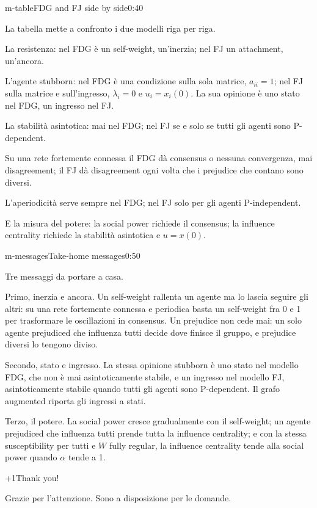 \begin{slide}{m-table}{FDG and FJ side by side}{0:40}
  \begin{discorso}
    \item La tabella mette a confronto i due modelli riga per riga.
    \item La resistenza: nel FDG è un self-weight, un'inerzia; nel FJ un attachment, un'ancora.
    \item L'agente stubborn: nel FDG è una condizione sulla sola matrice, $a_{ii}=1$; nel FJ sulla matrice e sull'ingresso, $\lambda_i=0$ e $u_i=x_i(0)$. La sua opinione è uno stato nel FDG, un ingresso nel FJ.
    \item La stabilità asintotica: mai nel FDG; nel FJ se e solo se tutti gli agenti sono P-dependent.
    \item Su una rete fortemente connessa il FDG dà consensus o nessuna convergenza, mai disagreement; il FJ dà disagreement ogni volta che i prejudice che contano sono diversi.
    \item L'aperiodicità serve sempre nel FDG; nel FJ solo per gli agenti P-independent.
    \item E la misura del potere: la social power richiede il consensus; la influence centrality richiede la stabilità asintotica e $u=x(0)$.
  \end{discorso}
\end{slide}

\begin{slide}{m-messages}{Take-home messages}{0:50}
  \begin{discorso}
    \item Tre messaggi da portare a casa.
    \item Primo, inerzia e ancora. Un self-weight rallenta un agente ma lo lascia seguire gli altri: su una rete fortemente connessa e periodica basta un self-weight fra 0 e 1 per trasformare le oscillazioni in consensus. Un prejudice non cede mai: un solo agente prejudiced che influenza tutti decide dove finisce il gruppo, e prejudice diversi lo tengono diviso.
    \item Secondo, stato e ingresso. La stessa opinione stubborn è uno stato nel modello FDG, che non è mai asintoticamente stabile, e un ingresso nel modello FJ, asintoticamente stabile quando tutti gli agenti sono P-dependent. Il grafo augmented riporta gli ingressi a stati.
    \item Terzo, il potere. La social power cresce gradualmente con il self-weight; un agente prejudiced che influenza tutti prende tutta la influence centrality; e con la stessa susceptibility per tutti e $W$ fully regular, la influence centrality tende alla social power quando $\alpha$ tende a 1.
  \end{discorso}
\end{slide}

\begin{slidepag}{\the\numexpr{}+1\relax}{Thank you!}{}
  \begin{discorso}
    \item Grazie per l'attenzione. Sono a disposizione per le domande.
  \end{discorso}
\end{slidepag}


